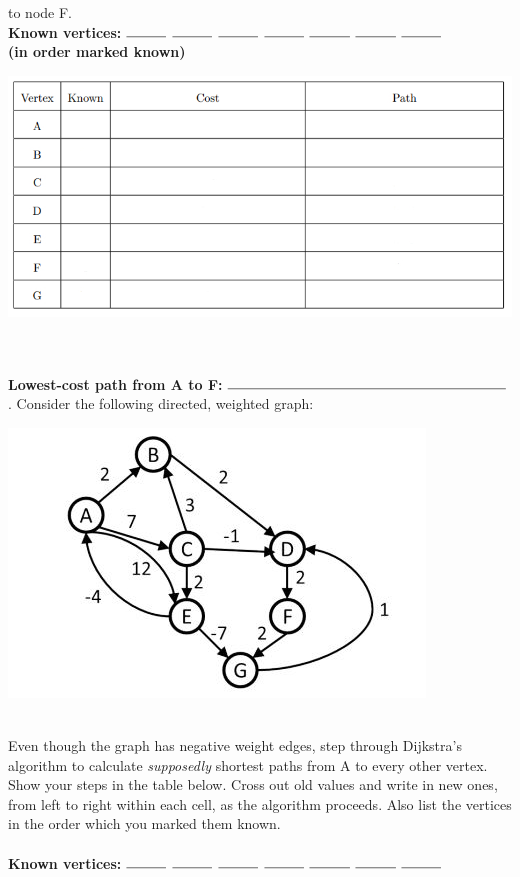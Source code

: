 \documentclass[12pt]{article}
\begin{document}
to node F.\\
\textbf{Known vertices:} $\rule{1cm}{0.15mm}$ $\rule{1cm}{0.15mm}$ $\rule{1cm}{0.15mm}$ $\rule{1cm}{0.15mm}$ $\rule{1cm}{0.15mm}$ $\rule{1cm}{0.15mm}$ $\rule{1cm}{0.15mm}$\\
\textbf{(in order marked known)}\\
\centerline{\includegraphics[scale = 2]{table.jpg}}\\\\
\textbf{Lowest-cost path from A to F:} $\rule{7cm}{0.15mm}$
\newpage 
{}. Consider the following directed, weighted graph:\\
\centerline{\includegraphics[scale = 0.7]{graph3.jpg}}\\
Even though the graph has negative weight edges, step through Dijkstra’s algorithm to calculate
\textit{supposedly} shortest paths from A to every other vertex. Show your steps in the table below.
Cross out old values and write in new ones, from left to right within each cell, as the algorithm
proceeds. Also list the vertices in the order which you marked them known.\\\\
\textbf{Known vertices:} $\rule{1cm}{0.15mm}$ $\rule{1cm}{0.15mm}$ $\rule{1cm}{0.15mm}$ $\rule{1cm}{0.15mm}$ $\rule{1cm}{0.15mm}$ $\rule{1cm}{0.15mm}$ $\rule{1cm}{0.15mm}$\\
\end{document}

